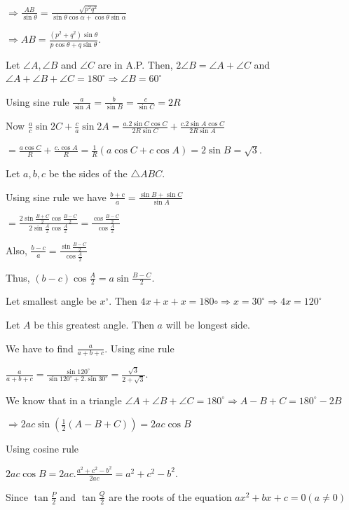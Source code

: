   $\Rightarrow \frac{AB}{\sin\theta} = \frac{\sqrt{p^2q^2}}{\sin\theta\cos\alpha + \cos\theta\sin\alpha}$

  $\Rightarrow AB = \frac{(p^2 + q^2)\sin\theta}{p\cos\theta + q\sin\theta}$.
\item Let $\angle A, \angle B$ and $\angle C$ are in A.P. Then, $2\angle B = \angle A + \angle C$ and
  $\angle A + \angle B + \angle C = 180^\circ \Rightarrow \angle B = 60^\circ$

  Using sine rule $\frac{a}{\sin A} = \frac{b}{\sin B} = \frac{c}{\sin C} = 2R$

  Now $\frac{a}{c}\sin2C + \frac{c}{a}\sin2A = \frac{a.2\sin C\cos C}{2R\sin C} + \frac{c.2\sin A\cos
    C}{2R\sin A}$

  $= \frac{a\cos C}{R} + \frac{c.\cos A}{R} = \frac{1}{R}(a\cos C + c\cos A) = 2\sin B = \sqrt{3}$.
\item Let $a, b, c$ be the sides of the $\triangle ABC$.

  Using sine rule we have $\frac{b + c}{a} = \frac{\sin B + \sin C}{\sin A}$

  $= \frac{2\sin\frac{B + C}{2}\cos\frac{B - C}{2}}{2\sin\frac{A}{2}\cos\frac{A}{2}} = \frac{\cos\frac{B -
      C}{2}}{\cos\frac{A}{2}}$

  Also, $\frac{b - c}{a} = \frac{\sin\frac{B - C}{2}}{\cos\frac{A}{2}}$

  Thus, $(b - c)\cos\frac{A}{2} = a\sin\frac{B - C}{2}$.
\item Let smallest angle be $x^\circ$. Then $4x + x + x = 180\circ \Rightarrow x = 30^\circ \Rightarrow 4x =
  120^\circ$

  Let $A$ be this greatest angle. Then $a$ will be longest side.

  We have to find $\frac{a}{a + b + c}$. Using sine rule

  $\frac{a}{a + b + c} = \frac{\sin120^\circ}{\sin120^\circ + 2.\sin30^\circ} = \frac{\sqrt{3}}{2
    + \sqrt{3}}$.
\item We know that in a triangle $\angle A + \angle B + \angle C = 180^\circ \Rightarrow A - B + C =
  180^\circ - 2B$

  $\Rightarrow 2ac\sin\left(\frac{1}{2}(A - B + C)\right) = 2ac\cos B$

  Using cosine rule

  $2ac\cos B = 2ac.\frac{a^2 + c^2 - b^2}{2ac} = a^2 + c^2 - b^2$.
\item Since $\tan\frac{P}{2}$ and $\tan\frac{Q}{2}$ are the roots of the equation $ax^2 + bx + c = 0(a\ne
  0)$

